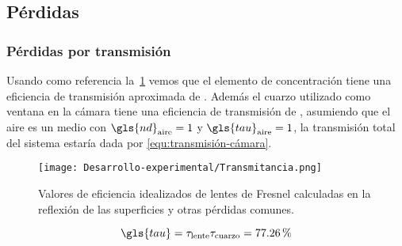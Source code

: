 		\subsection{Pérdidas}
			
			\subsubsection{Pérdidas por transmisión}
				
				Usando como referencia la~\cref{fig:Transmitancia} vemos que el elemento de concentración tiene una eficiencia de transmisión aproximada de . Además el cuarzo utilizado como ventana en la cámara tiene una eficiencia de transmisión de , asumiendo que el aire es un medio con $\gls{nd}_{\text{aire}} = 1$ y $\gls{tau}_{\text{aire}} = 1$, la transmisión total del sistema estaría dada por \eqref{equ:transmisión-cámara}.
		
				\begin{figure}[H]
					\centering
					\texttt{[image: Desarrollo-experimental/Transmitancia.png]}
					\caption{Valores de eficiencia idealizados de lentes de Fresnel calculadas en la reflexión de las superficies y otras pérdidas comunes.}
					\label{fig:Transmitancia}
				\end{figure}
				
				\begin{equation}\label{equ:transmisión-cámara}
					\gls{tau} = \tau_{\text{lente}}\tau_{\text{cuarzo}} = \percent{77.26}
				\end{equation}